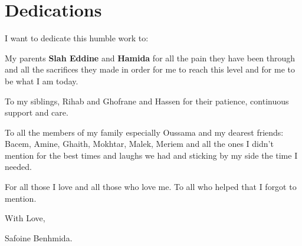 \chapter*{Dedications}

\begin{center}
I want to dedicate this humble work to: \\
\end{center}
\begin{center}
My parents \textbf{Slah Eddine} and \textbf{Hamida} for all the pain they have been through and all the sacrifices they made in order for me to reach this level and for me to be what I am today.\\
\end{center}
\begin{center}
To my siblings, Rihab and Ghofrane and Hassen for their patience, continuous support and care.
\end{center}
\begin{center}
To all the members of my family especially Oussama and my dearest friends: Bacem, Amine, Ghaith, Mokhtar, Malek,  Meriem and all the ones I didn’t mention for the best times and laughs we had and sticking by my side the time I needed. \\
\end{center}
\begin{center}
For all those I love and all those who love me.
To all who helped that I forgot to mention.
\end{center}


\begin{flushright}
With Love,

Safoine Benhmida.
\end{flushright}